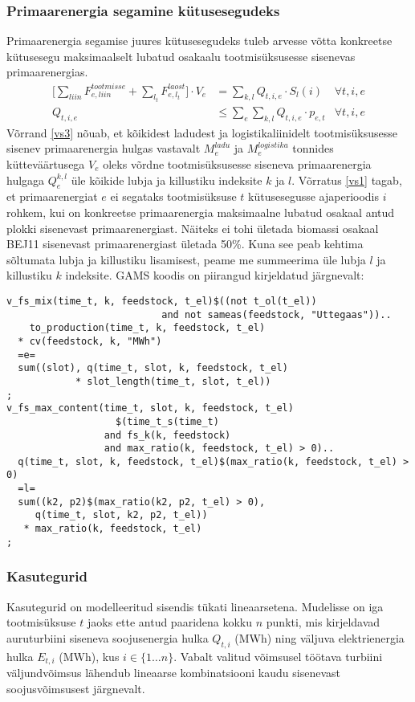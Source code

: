 \documentclass[10pt,a4paper]{article}
\begin{document}
\subsubsection{Primaarenergia segamine kütusesegudeks}
Primaarenergia segamise juures kütusesegudeks tuleb arvesse võtta konkreetse kütusesegu maksimaalselt lubatud osakaalu tootmisüksusesse sisenevas primaarenergias. 
\begin{align}
\bigg[\sum_{liin} F^{tootmisse}_{e,liin} + \sum_{l_t} F^{laost}_{e,l_t}\bigg]\cdot V_e &= \sum_{k,l} Q_{t,i,e}\cdot S_l(i) &\forall t,i,e \label{vs3} \\
Q_{t,i,e} &\leq \sum_e \sum_{k,l} Q_{t,i,e} \cdot p_{e,t} &\forall t,i,e \label{vs1}
\end{align}
Võrrand \eqref{vs3} nõuab, et kõikidest ladudest ja logistikaliinidelt tootmisüksusesse sisenev primaarenergia hulgas vastavalt $M^{ladu}_e$ ja $M^{logistika}_e$ tonnides kütteväärtu\-sega $V_e$ oleks võrdne tootmisüksusesse siseneva primaarenergia hulgaga $Q^{k,l}_e$ üle kõikide lubja ja killustiku indeksite $k$ ja $l$.
Võrratus \eqref{vs1} tagab, et primaarenergiat $e$ ei segataks tootmisüksuse $t$ kütusesegu\-sse ajaperioodis $i$  rohkem, kui on konkreetse primaarenergia maksimaalne lubatud osakaal antud plokki sisenevast primaarenergiast. Näiteks ei tohi ületada biomassi osakaal BEJ11 sisenevast primaarenergiast ületada 50\%. Kuna see peab kehtima sõltumata lubja ja killustiku lisamisest, peame me summeerima üle lubja $l$ ja killustiku $k$ indeksite.
GAMS koodis on piirangud kirjeldatud järgnevalt:
\begin{verbatim}
v_fs_mix(time_t, k, feedstock, t_el)$((not t_ol(t_el))
                           and not sameas(feedstock, "Uttegaas"))..
    to_production(time_t, k, feedstock, t_el)
  * cv(feedstock, k, "MWh")
  =e=
  sum((slot), q(time_t, slot, k, feedstock, t_el)
            * slot_length(time_t, slot, t_el))
;
v_fs_max_content(time_t, slot, k, feedstock, t_el)
                   $(time_t_s(time_t)
                 and fs_k(k, feedstock)
                 and max_ratio(k, feedstock, t_el) > 0)..
  q(time_t, slot, k, feedstock, t_el)$(max_ratio(k, feedstock, t_el) > 0)
  =l=
  sum((k2, p2)$(max_ratio(k2, p2, t_el) > 0),
     q(time_t, slot, k2, p2, t_el))
   * max_ratio(k, feedstock, t_el)
;
\end{verbatim}


\subsubsection{Kasutegurid}
Kasutegurid on modelleeritud sisendis tükati lineaarsetena. Mudelisse on iga tootmis\-üksuse $t$ jaoks ette antud paaridena kokku $n$ punkti,  mis kirjeldavad auruturbiini siseneva soojusenergia hulka $Q_{t,i}$ (MWh) ning väljuva elektrienergia hulka $E_{t,i}$ (MWh), kus $i \in \{1\dots n\}$. Vabalt valitud võimsusel töötava turbiini väljund\-võimsus lähendub lineaarse kombinatsiooni kaudu sisenevast soojusvõimsusest järgnevalt.
 
\end{document}
